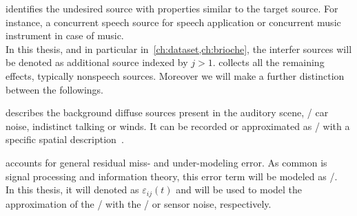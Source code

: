  identifies the undesired source with properties similar to the target source.
For instance, a concurrent speech source for speech application or concurrent music instrument in case of music.
\\In this thesis, and in particular in~\cref{ch:dataset,ch:brioche}, the interfer sources will be denoted
as additional source indexed by $j > 1$.
 collects all the remaining effects, typically nonspeech sources. Moreover we will make a further distinction between the followings.

 describes the background diffuse sources present in the auditory scene, \eg/ car noise, indistinct talking or winds.
It can be recorded or approximated as \AWGN/ with a specific spatial description~.

 accounts for general residual miss- and under-modeling error.
As common is signal processing and information theory, this error term will be modeled as \AWGN/.
\\In this thesis, it will denoted as $\varepsilon_{ij}( t)$ and will be used to model the
approximation of the \RIR/ with the \ISM/ or sensor noise, respectively.


